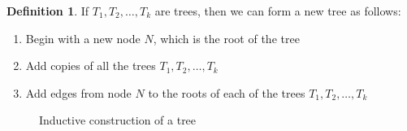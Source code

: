 \documentclass[11pt]{article}
\theoremstyle{plain}
\theoremstyle{definition}
\newtheorem{definition}{Definition}[section]
\begin{document}
\begin{definition}\label{def:tree}\rm
    If $T_1, T_2, \ldots, T_k$ are trees, then we can form a new tree
    as follows:
    \begin{enumerate}
        \item
            Begin with a new node $N$, which is the root of the tree
        \item
            Add copies of all the trees $T_1, T_2, \ldots, T_k$
        \item
            Add edges from node $N$ to the roots of each of the trees
            $T_1, T_2, \dots, T_k$
    \end{enumerate}
\end{definition}
\begin{figure}[H]
  \centering
  \caption{Inductive construction of a tree}
\end{figure}
\end{document}
